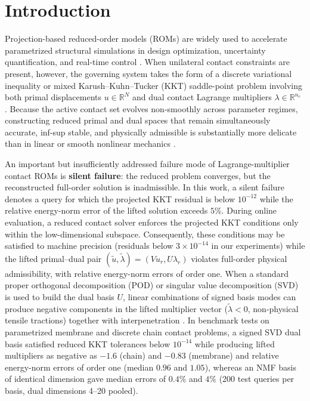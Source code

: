 \documentclass[11pt,a4paper]{article}
\begin{document}
\section{Introduction}

Projection-based reduced-order models (ROMs) are widely used to accelerate parametrized structural simulations in design optimization, uncertainty quantification, and real-time control \cite{benner2015survey, balajewicz2016projection, benaceur2020reduced}. When unilateral contact constraints are present, however, the governing system takes the form of a discrete variational inequality or mixed Karush--Kuhn--Tucker (KKT) saddle-point problem involving both primal displacements $u \in \mathbb{R}^N$ and dual contact Lagrange multipliers $\lambda \in \mathbb{R}^{n_c}$ \cite{kikuchi1988contact, brezzi1991mixed, hild2007residual, franceschini2022block}. Because the active contact set evolves non-smoothly across parameter regimes, constructing reduced primal and dual spaces that remain simultaneously accurate, inf-sup stable, and physically admissible is substantially more delicate than in linear or smooth nonlinear mechanics \cite{haasdonk2012reduced, rozza2013reduced, leberre2022condition, niakh2024reduced}.

An important but insufficiently addressed failure mode of Lagrange-multiplier contact ROMs is \textbf{silent failure}: the reduced problem converges, but the reconstructed full-order solution is inadmissible. In this work, a silent failure denotes a query for which the projected KKT residual is below $10^{-12}$ while the relative energy-norm error of the lifted solution exceeds $5\%$. During online evaluation, a reduced contact solver enforces the projected KKT conditions only within the low-dimensional subspace. Consequently, these conditions may be satisfied to machine precision (residuals below $3 \times 10^{-14}$ in our experiments) while the lifted primal--dual pair $(\tilde{u}, \tilde{\lambda}) = (V u_r, U \lambda_r)$ violates full-order physical admissibility, with relative energy-norm errors of order one. When a standard proper orthogonal decomposition (POD) or singular value decomposition (SVD) is used to build the dual basis $U$, linear combinations of signed basis modes can produce negative components in the lifted multiplier vector ($\tilde{\lambda} < 0$, non-physical tensile tractions) together with interpenetration \cite{balajewicz2016projection, benaceur2020reduced}. In benchmark tests on parametrized membrane and discrete chain contact problems, a signed SVD dual basis satisfied reduced KKT tolerances below $10^{-14}$ while producing lifted multipliers as negative as $-1.6$ (chain) and $-0.83$ (membrane) and relative energy-norm errors of order one (median $0.96$ and $1.05$), whereas an NMF basis of identical dimension gave median errors of $0.4\%$ and $4\%$ (200 test queries per basis, dual dimensions 4--20 pooled).
\end{document}
